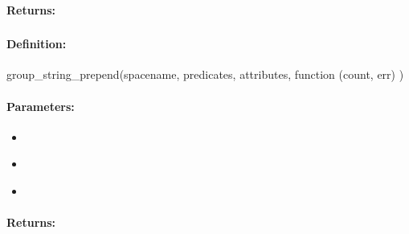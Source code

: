 \paragraph{Returns:}


\pagebreak
\subsubsection{}
\label{api:nodejs:group_string_prepend}


\paragraph{Definition:}
\begin{javascriptcode}
group_string_prepend(spacename, predicates, attributes, function (count, err) {})
\end{javascriptcode}
\paragraph{Parameters:}
\begin{itemize}[noitemsep]
\item {}\\

\item {}\\

\item {}\\

\end{itemize}

\paragraph{Returns:}


\pagebreak
\subsubsection{}
\label{api:nodejs:string_prepend}


